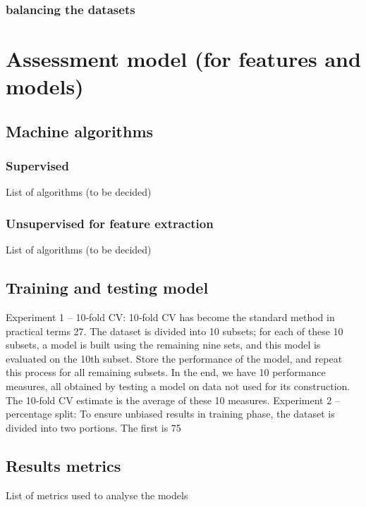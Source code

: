 \subsubsection{balancing the datasets}
\section{Assessment model (for features and models)}
\subsection{Machine algorithms}
\subsubsection{Supervised}
List of algorithms (to be decided)
\subsubsection{Unsupervised for feature extraction}
List of algorithms (to be decided)
\subsection{Training and testing model}
\cite{dns-traffic}
Experiment 1 – 10‐fold CV: 10‐fold CV has become the standard method in practical terms 27. The dataset is divided into 10 subsets; for each of these 10 subsets, a model is built using the remaining nine sets, and this model is evaluated on the 10th subset. Store the performance of the model, and repeat this process for all remaining subsets. In the end, we have 10 performance measures, all obtained by testing a model on data not used for its construction. The 10‐fold CV estimate is the average of these 10 measures.
Experiment 2 – percentage split: To ensure unbiased results in training phase, the dataset is divided into two portions. The first is 75%
\subsection{Results metrics}
List of metrics used to analyse the models 
\cite{fitting}